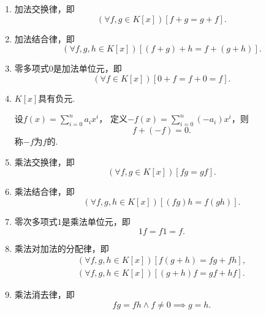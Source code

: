 \begin{enumerate}
	\item 加法交换律，即\begin{equation*}
		(\forall f,g \in K[x])[f+g=g+f].
	\end{equation*}

	\item 加法结合律，即\begin{equation*}
		(\forall f,g,h \in K[x])[(f+g)+h=f+(g+h)].
	\end{equation*}

	\item 零多项式\(0\)是加法单位元，即\begin{equation*}
		(\forall f \in K[x])[0+f=f+0=f].
	\end{equation*}

	\item \(K[x]\)具有负元.

	设\(f(x)=\sum_{i=0}^n a_i x^i\)，
	定义\(-f(x)=\sum_{i=0}^n (-a_i) x^i\)，则\begin{equation*}
		f+(-f)=0.
	\end{equation*}
	称\(-f\)为\(f\)的.

	\item 乘法交换律，即\begin{equation*}
		(\forall f,g \in K[x])[fg=gf].
	\end{equation*}

	\item 乘法结合律，即\begin{equation*}
		(\forall f,g,h \in K[x])[(fg)h=f(gh)].
	\end{equation*}

	\item 零次多项式\(1\)是乘法单位元，即\begin{equation*}
		1f=f1=f.
	\end{equation*}

	\item 乘法对加法的分配律，即\begin{gather*}
		(\forall f,g,h \in K[x])[f(g+h)=fg+fh], \\
		(\forall f,g,h \in K[x])[(g+h)f=gf+hf].
	\end{gather*}

	\item 乘法消去律，即\begin{equation*}
		fg=fh \land f\neq0 \implies g=h.
	\end{equation*}
\end{enumerate}

